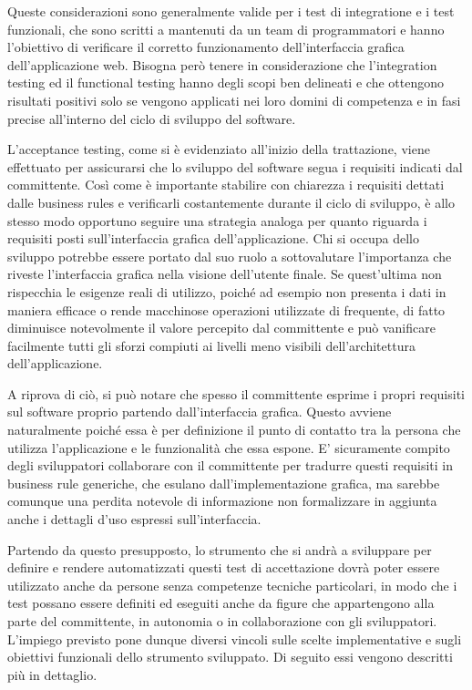 \documentclass[12pt]{toptesi}
\begin{document}
Queste considerazioni sono generalmente valide per i test di integratione e i test funzionali, che sono scritti a mantenuti da un team di programmatori e hanno l'obiettivo di verificare il corretto funzionamento dell'interfaccia grafica dell'applicazione web. Bisogna però tenere in considerazione che l'integration testing ed il functional testing hanno degli scopi ben delineati e che ottengono risultati positivi solo se vengono applicati nei loro domini di competenza e in fasi precise all'interno del ciclo di sviluppo del software. 

L'acceptance testing, come si è evidenziato all'inizio della trattazione, viene effettuato per assicurarsi che lo sviluppo del software segua i requisiti indicati dal committente. Così come è importante stabilire con chiarezza i requisiti dettati dalle business rules e verificarli costantemente durante il ciclo di sviluppo, è allo stesso modo opportuno seguire una strategia analoga per quanto riguarda i requisiti posti sull'interfaccia grafica dell'applicazione.  
Chi si occupa dello sviluppo potrebbe essere portato dal suo ruolo a sottovalutare l'importanza che riveste l'interfaccia grafica nella visione dell'utente finale. Se quest'ultima non rispecchia le esigenze reali di utilizzo, poiché ad esempio non presenta i dati in maniera efficace o rende macchinose operazioni utilizzate di frequente, di fatto diminuisce notevolmente il valore percepito dal committente e può vanificare facilmente tutti gli sforzi compiuti ai livelli meno visibili dell'architettura dell'applicazione. 

A riprova di ciò, si può notare che spesso il committente esprime i propri requisiti sul software proprio partendo dall'interfaccia grafica. Questo avviene naturalmente poiché essa è per definizione il punto di contatto tra la persona che utilizza l'applicazione e le funzionalità che essa espone. E' sicuramente compito degli sviluppatori collaborare con il committente per tradurre questi requisiti in business rule generiche, che esulano dall'implementazione grafica, ma sarebbe comunque una perdita notevole di informazione non formalizzare in aggiunta anche i dettagli d'uso espressi sull'interfaccia.

Partendo da questo presupposto, lo strumento che si andrà a sviluppare per definire e rendere automatizzati questi test di accettazione dovrà poter essere utilizzato anche da persone senza competenze tecniche particolari, in modo che i test possano essere definiti ed eseguiti anche da figure che appartengono alla parte del committente, in autonomia o in collaborazione con gli sviluppatori. L'impiego previsto pone dunque diversi vincoli sulle scelte implementative e sugli obiettivi funzionali dello strumento sviluppato. Di seguito essi vengono descritti più in dettaglio.
\end{document}
